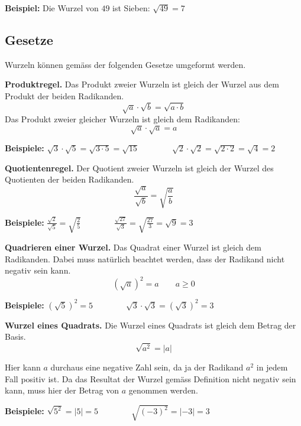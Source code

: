 \begin{example}
  \textbf{Beispiel:} Die Wurzel von $49$ ist Sieben: $\sqrt{49} = 7$
\end{example}

\subsection{Gesetze}

Wurzeln können gemäss der folgenden Gesetze umgeformt werden.

\begin{theorem}
  \textbf{Produktregel.} Das Produkt zweier Wurzeln ist gleich der Wurzel aus dem Produkt der beiden Radikanden.
  \[
    \sqrt{a}\cdot\sqrt{b} = \sqrt{a\cdot b}
  \]
  Das Produkt zweier gleicher Wurzeln ist gleich dem Radikanden:
  \[
    \sqrt{a}\cdot\sqrt{a} = a
  \]
\end{theorem}

\begin{example}
  \textbf{Beispiele:} $\displaystyle \sqrt{3}\cdot\sqrt{5} = \sqrt{3\cdot 5} = \sqrt{15} \qquad\qquad \sqrt{2}\cdot\sqrt{2} = \sqrt{2\cdot 2} = \sqrt{4} = 2$
\end{example}

\begin{theorem}
  \textbf{Quotientenregel.} Der Quotient zweier Wurzeln ist gleich der Wurzel des Quotienten der beiden Radikanden.
  \[
    \frac{\sqrt{a}}{\sqrt{b}} = \sqrt{\frac{a}{b}}
  \]
\end{theorem}

\begin{example}
  \textbf{Beispiele:} $\displaystyle \frac{\sqrt{2}}{\sqrt{5}} = \sqrt{\frac{2}{5}} \qquad\qquad \frac{\sqrt{27}}{\sqrt{3}} = \sqrt{\frac{27}{3}} = \sqrt{9} = 3$
\end{example}

\begin{theorem}
  \textbf{Quadrieren einer Wurzel.} Das Quadrat einer Wurzel ist gleich dem Radikanden. Dabei muss natürlich beachtet werden, dass der Radikand nicht negativ sein kann.
  \[
    \left(\sqrt{a}\right)^{2} = a \qquad a\ge 0
  \]
\end{theorem}

\begin{example}
  \textbf{Beispiele:} $\displaystyle \left(\sqrt{5}\right)^{2} = 5 \qquad\qquad \sqrt{3}\cdot\sqrt{3} = \left(\sqrt{3}\right)^{2} = 3$
\end{example}

\begin{theorem}
  \textbf{Wurzel eines Quadrats.} Die Wurzel eines Quadrats ist gleich dem Betrag der Basis.
  \[
    \sqrt{a^{2}} = |a|
  \]
\end{theorem}
Hier kann $a$ durchaus eine negative Zahl sein, da ja der Radikand $a^{2}$ in jedem Fall positiv ist. Da das Resultat der Wurzel gemäss Definition nicht negativ sein kann, muss hier der Betrag von $a$ genommen werden.

\begin{example}
  \textbf{Beispiele:} $\displaystyle \sqrt{5^{2}} = |5| = 5 \qquad\qquad \sqrt{(-3)^{2}} = |-3| = 3$
\end{example}

